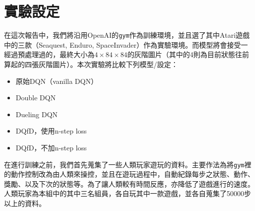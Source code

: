 \documentclass{article}
\begin{document}
\section{實驗設定}
在這次報告中，我們將沿用OpenAI的\texttt{gym}作為訓練環境，並且選了其中Atari遊戲中的三款（Seaquest, Enduro, SpaceInvader）作為實驗環境。而模型將會接受一經過預處理過的，最終大小為$4\times 84 \times 84$的灰階圖片（其中的4則為目前狀態往前算起的四張灰階圖片）。本次實驗將比較下列模型/設定：
\begin{itemize}
    \item 原始DQN（vanilla DQN）
    \item Double DQN
    \item Dueling DQN
    \item DQfD，使用n-step loss
    \item DQfD，不加n-step loss
\end{itemize}
在進行訓練之前，我們首先蒐集了一些人類玩家遊玩的資料。主要作法為將\texttt{gym}裡的動作控制改為由人類來操控，並且在遊玩過程中，自動紀錄每步之狀態、動作、獎勵、以及下次的狀態等。為了讓人類較有時間反應，亦降低了遊戲進行的速度。人類玩家為本組中的其中三名組員，各自玩其中一款遊戲，並各自蒐集了50000步以上的資料。
\end{document}
